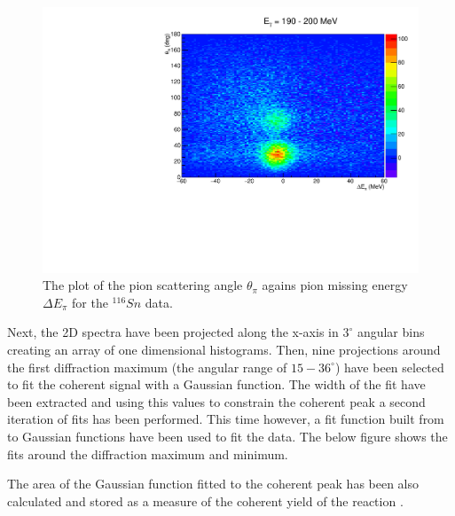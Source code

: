 \begin{figure}[H]
\begin{center}
\includegraphics[scale=0.65]{pictures/pdf/2d_sn116_eg7.pdf}
\caption{The plot of the pion scattering angle $\theta_{\pi}$ agains pion missing energy $\Delta E_{\pi}$ for the $^{116}Sn$ data.}
\label{2drandomsub}
\end{center}
\end{figure}

\indent Next, the 2D spectra have been projected along the x-axis in $3^{\circ}$ angular bins creating an array of one dimensional histograms. Then, nine projections around the first diffraction maximum (the angular range of $15-36^{\circ}$) have been selected to fit the coherent signal with a Gaussian function. The width of the fit have been extracted and using this values to constrain the coherent peak a second iteration of fits has been performed. This time however, a fit function built from to Gaussian functions have been used to fit the data. The below figure shows the fits around the diffraction maximum and minimum.

\indent The area of the Gaussian function fitted to the coherent peak has been also calculated and stored as a measure of the coherent yield of the reaction \cite{claire2}.

